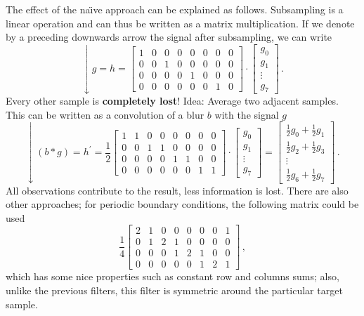 The effect of the na\"\i{}ve approach can be explained as follows. Subsampling
is a linear operation and can thus be written as a matrix multiplication. If we
denote by a preceding downwards arrow the signal after subsampling, we can write
\begin{equation*}
  \downarrow g = h =
  \begin{bmatrix}
    1 & 0 & 0 & 0 & 0 & 0 & 0 & 0 \\
    0 & 0 & 1 & 0 & 0 & 0 & 0 & 0 \\
    0 & 0 & 0 & 0 & 1 & 0 & 0 & 0 \\
    0 & 0 & 0 & 0 & 0 & 0 & 1 & 0
  \end{bmatrix}
  \cdot
  \begin{bmatrix}
    g_0 \\ g_1 \\ \vdots \\ g_7
  \end{bmatrix}\,.
\end{equation*}
Every other sample is \textbf{completely lost}! Idea: Average two adjacent
samples. This can be written as a convolution of a blur $b$ with the signal $g$
\begin{equation*}
  \downarrow (b \ast g) = h^\prime = \frac{1}{2}
  \begin{bmatrix}
    1 & 1 & 0 & 0 & 0 & 0 & 0 & 0 \\
    0 & 0 & 1 & 1 & 0 & 0 & 0 & 0 \\
    0 & 0 & 0 & 0 & 1 & 1 & 0 & 0 \\
    0 & 0 & 0 & 0 & 0 & 0 & 1 & 1
  \end{bmatrix}
  \cdot
  \begin{bmatrix}
    g_0 \\ g_1 \\ \vdots \\ g_7
  \end{bmatrix}
  =
  \begin{bmatrix}
    \frac{1}{2} g_0 + \frac{1}{2} g_1 \\
    \frac{1}{2} g_2 + \frac{1}{2} g_3 \\
    \vdots \\
    \frac{1}{2} g_6 + \frac{1}{2} g_7
  \end{bmatrix}\,.
\end{equation*}
All observations contribute to the result, \ie less information is lost. There
are also other approaches; for periodic boundary conditions, the following
matrix could be used
\begin{equation*}
  \frac{1}{4}
  \begin{bmatrix}
    2 & 1 & 0 & 0 & 0 & 0 & 0 & 1 \\
    0 & 1 & 2 & 1 & 0 & 0 & 0 & 0 \\
    0 & 0 & 0 & 1 & 2 & 1 & 0 & 0 \\
    0 & 0 & 0 & 0 & 0 & 1 & 2 & 1
  \end{bmatrix}\,,
\end{equation*}
which has some nice properties such as constant row and columns sums; also,
unlike the previous filters, this filter is symmetric around the particular
target sample.


